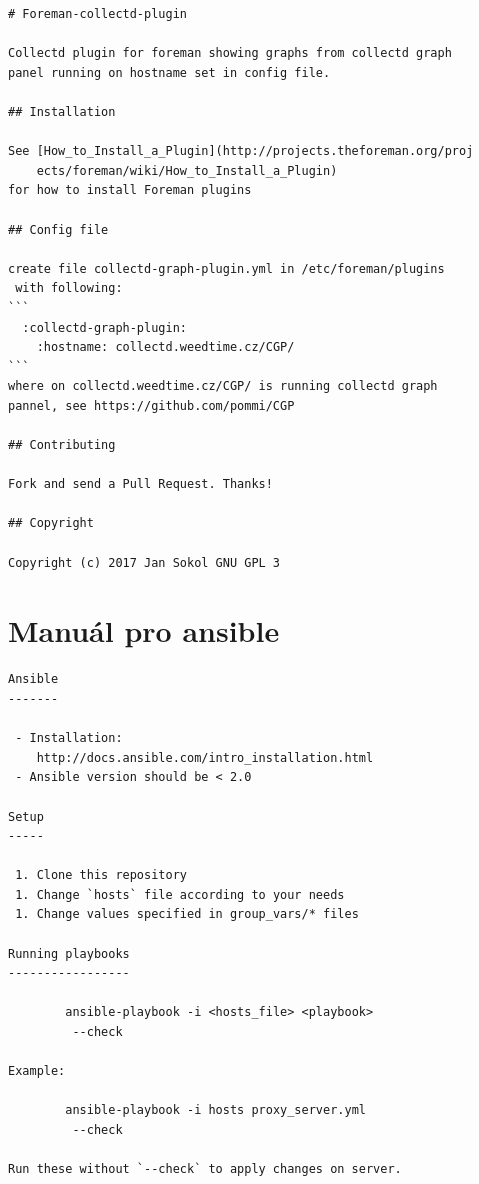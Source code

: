 \documentclass[thesis=B,czech]{FITthesis}[2017/05/04]
\begin{document}
\begin{verbatim}
# Foreman-collectd-plugin

Collectd plugin for foreman showing graphs from collectd graph
panel running on hostname set in config file.

## Installation

See [How_to_Install_a_Plugin](http://projects.theforeman.org/proj
	ects/foreman/wiki/How_to_Install_a_Plugin)
for how to install Foreman plugins

## Config file

create file collectd-graph-plugin.yml in /etc/foreman/plugins
 with following:
```
  :collectd-graph-plugin:
    :hostname: collectd.weedtime.cz/CGP/
```
where on collectd.weedtime.cz/CGP/ is running collectd graph
pannel, see https://github.com/pommi/CGP

## Contributing

Fork and send a Pull Request. Thanks!

## Copyright

Copyright (c) 2017 Jan Sokol GNU GPL 3

\end{verbatim}


\chapter{Manuál pro ansible}

\begin{verbatim}
Ansible
-------

 - Installation:
 	http://docs.ansible.com/intro_installation.html
 - Ansible version should be < 2.0

Setup
-----

 1. Clone this repository
 1. Change `hosts` file according to your needs
 1. Change values specified in group_vars/* files

Running playbooks
-----------------

		ansible-playbook -i <hosts_file> <playbook>
		 --check

Example:

		ansible-playbook -i hosts proxy_server.yml
		 --check

Run these without `--check` to apply changes on server.
\end{verbatim}
\end{document}
